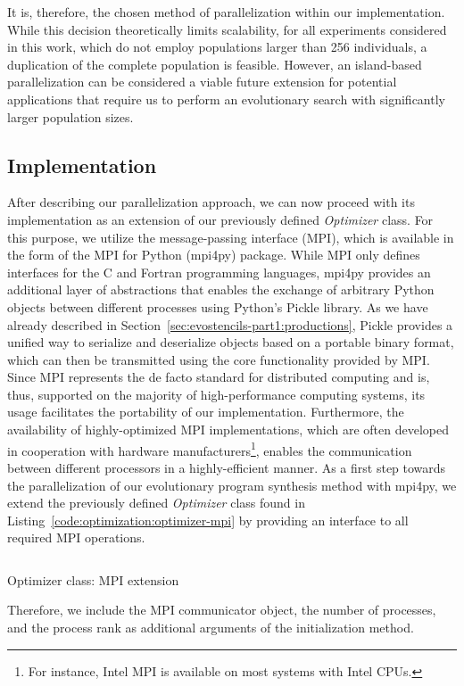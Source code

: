 It is, therefore, the chosen method of parallelization within our implementation.
While this decision theoretically limits scalability, for all experiments considered in this work, which do not employ populations larger than 256 individuals, a duplication of the complete population is feasible.
However, an island-based parallelization can be considered a viable future extension for potential applications that require us to perform an evolutionary search with significantly larger population sizes.

\subsection{Implementation}
After describing our parallelization approach, we can now proceed with its implementation as an extension of our previously defined \emph{Optimizer} class.
For this purpose, we utilize the message-passing interface (MPI), which is available in the form of the MPI for Python (mpi4py) package.
While MPI only defines interfaces for the C and Fortran programming languages, mpi4py provides an additional layer of abstractions that enables the exchange of arbitrary Python objects between different processes using Python's Pickle library.
As we have already described in Section~\ref{sec:evostencils-part1:productions}, Pickle provides a unified way to serialize and deserialize objects based on a portable binary format, which can then be transmitted using the core functionality provided by MPI.
Since MPI represents the de facto standard for distributed computing and is, thus, supported on the majority of high-performance computing systems, its usage facilitates the portability of our implementation.
Furthermore, the availability of highly-optimized MPI implementations, which are often developed in cooperation with hardware manufacturers\footnote{For instance, Intel MPI is available on most systems with Intel CPUs.}, enables the communication between different processors in a highly-efficient manner.
As a first step towards the parallelization of our evolutionary program synthesis method with mpi4py, we extend the previously defined \emph{Optimizer} class found in Listing~\ref{code:optimization:optimizer-mpi} by providing an interface to all required MPI operations. 
\begin{listing}
	\inputminted[linenos]{python}{evostencils/optimization/optimizer_mpi.py}
	\caption{Optimizer class: MPI extension}
	\label{code:optimization:optimizer-mpi}
\end{listing}
Therefore, we include the MPI communicator object, the number of processes, and the process rank as additional arguments of the initialization method.
